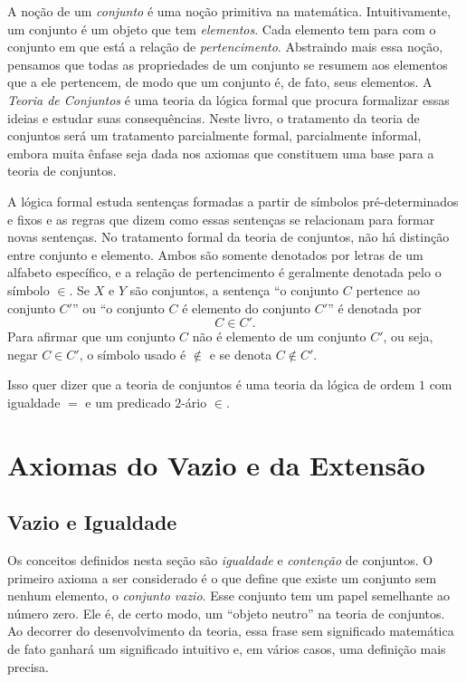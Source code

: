 A noção de um \emph{conjunto} é uma noção primitiva na matemática. Intuitivamente, um conjunto é um objeto que tem \emph{elementos}. Cada elemento tem para com o conjunto em que está a relação de \emph{pertencimento}. Abstraindo mais essa noção, pensamos que todas as propriedades de um conjunto se resumem aos elementos que a ele pertencem, de modo que um conjunto é, de fato, seus elementos. A \emph{Teoria de Conjuntos} é uma teoria da lógica formal que procura formalizar essas ideias e estudar suas consequências. Neste livro, o tratamento da teoria de conjuntos será um tratamento parcialmente formal, parcialmente informal, embora muita ênfase seja dada nos axiomas que constituem uma base para a teoria de conjuntos.

A lógica formal estuda sentenças formadas a partir de símbolos pré-determinados e fixos e as regras que dizem como essas sentenças se relacionam para formar novas sentenças. No tratamento formal da teoria de conjuntos, não há distinção entre conjunto e elemento. Ambos são somente denotados por letras de um alfabeto específico, e a relação de pertencimento é geralmente denotada pelo o símbolo $\in$. Se $X$ e $Y$ são conjuntos, a sentença ``o conjunto $C$ pertence ao conjunto $C'$'' ou ``o conjunto $C$ é elemento do conjunto $C'$'' é denotada por 
	\begin{equation*}
	C \in C'.
	\end{equation*}
Para afirmar que um conjunto $C$ não é elemento de um conjunto $C'$, ou seja, negar $C \in C'$, o símbolo usado é $\notin$ e se denota $C \notin C'$.

Isso quer dizer que a teoria de conjuntos é uma teoria da lógica de ordem $1$ com igualdade $=$ e um predicado $2$-ário $\in$.

\section{Axiomas do Vazio e da Extensão}

\subsection{Vazio e Igualdade}

Os conceitos definidos nesta seção são \emph{igualdade} e \emph{contenção} de conjuntos. O primeiro axioma a ser considerado é o que define que existe um conjunto sem nenhum elemento, o \emph{conjunto vazio}. Esse conjunto tem um papel semelhante ao número zero. Ele é, de certo modo, um ``objeto neutro'' na teoria de conjuntos. Ao decorrer do desenvolvimento da teoria, essa frase sem significado matemática de fato ganhará um significado intuitivo e, em vários casos, uma definição mais precisa.

